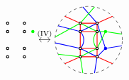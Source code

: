 \[\begin{tikzcd}[row sep=-3pc, column sep=1pc]
\begin{tikzpicture}[baseline=-.5ex,scale=0.6]
\draw[thick,red, fill=red] ;
\draw[thick,green, fill=green](1,1/2) circle (2pt) ;
\draw[thick,fill=white] (-1/2,1) circle (2pt) (-1/2,1/2)circle (2pt) (-1/2,-1/2)circle (2pt) (-1/2,-1)circle (2pt) (1/2,1)circle (2pt) (1/2,1/2) circle (2pt) (1/2,-1/2) circle (2pt)  (1/2,-1) circle (2pt);
\end{tikzpicture} 
\ar[r,leftrightarrow, "\Move{IV}"] 
&
\begin{tikzpicture}[baseline=-.5ex,scale=0.6]
\draw [dashed] (0,0) circle [radius=2];
\draw[blue, thick] (155:2) -- (-1/2,1/2) -- (0.5, 1) -- (100:2)
(-175:2) -- (-1/2,-1/2) -- (1/2,-1) -- (-80:2)
(-1/2,1/2) to[out=-45,in=45] (-1/2, -1/2) (1/2,1) -- (1,-1/2) -- (-10:2) (1/2, -1) -- (1,-1/2);
\draw[red, thick] (135:2) -- (-0.5,1) -- (-0.5,-1) -- (-135:2) 
(45:2) -- (0.5,1) -- (0.5,-1) -- (-45:2)
(-0.5,1) -- (0.5,1)
(-1/2,1/2) -- (0.5,1/2)
(-1/2,-1/2) -- (1/2,-1/2)
(-0.5,-1) -- (1/2,-1);
\draw[green, thick] (175:2) -- (-1/2,1) -- (80:2)
(-155:2) -- (-1/2,-1) -- (-100:2)
(-1/2,1) -- (1/2,1/2) to[out=-135,in=135] (1/2,-1/2) -- (-1/2,-1)
(1/2,1/2) -- (1,1/2) -- (10:2)
(1/2,-1/2) -- (1,1/2);
\draw[thick,red, fill=red] ;
\draw[thick,blue, fill=blue] (1,-0.5) circle (2pt);
\draw[thick,green, fill=green](1,1/2) circle (2pt) ;
\draw[thick,fill=white] (-1/2,1) circle (2pt) (-1/2,1/2)circle (2pt) (-1/2,-1/2)circle (2pt) (-1/2,-1)circle (2pt) (1/2,1)circle (2pt) (1/2,1/2) circle (2pt) (1/2,-1/2) circle (2pt)  (1/2,-1) circle (2pt);
\end{tikzpicture} 
\end{tikzcd}
\]


